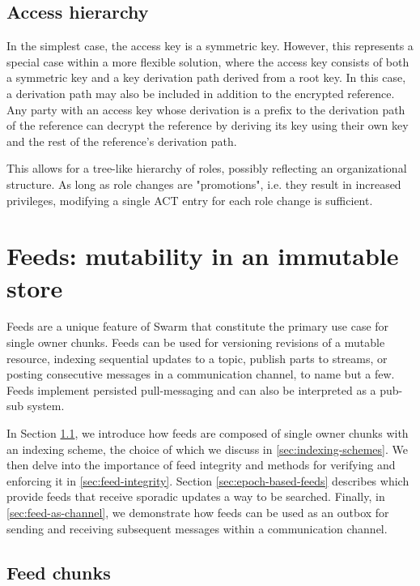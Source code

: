 \subsection{Access hierarchy\statusgreen}

In the simplest case, the access key is a symmetric key. However, this represents a special case within a more flexible solution, where
the access key consists of both a symmetric key and a key derivation path derived from a root key. In this case, a derivation path may also be included in addition to the encrypted reference. Any party with an access key whose derivation is a prefix to the derivation path of the reference can decrypt the reference by deriving its key using their own key and the rest of the reference's derivation path.

This allows for a tree-like hierarchy of roles, possibly reflecting an organizational structure. As long as role changes are "promotions", i.e. they result in increased privileges, modifying a single ACT entry for each role change is sufficient.




\section{Feeds: mutability in an immutable store \statusyellow}\label{sec:feeds}

\green{}

Feeds are a unique feature of Swarm that constitute the primary use case for single owner chunks. Feeds can be used for versioning revisions of a mutable resource, indexing sequential updates to a topic, publish parts to streams, or posting consecutive messages in a communication channel, to name but a few. Feeds implement persisted pull-messaging and can also be interpreted as a pub-sub system.

In Section \ref{sec:feed-chunks}, we introduce how feeds are composed of single owner chunks with an indexing scheme, the choice of which we discuss in \ref{sec:indexing-schemes}. We then delve into the importance of feed integrity and methods for verifying and enforcing it in \ref{sec:feed-integrity}. Section \ref{sec:epoch-based-feeds} describes  which provide feeds that receive sporadic updates a way to be searched. Finally, in \ref{sec:feed-as-channel}, we demonstrate how feeds can be used as an outbox for sending and receiving subsequent messages within a communication channel.


\subsection{Feed chunks \statusyellow}\label{sec:feed-chunks}

